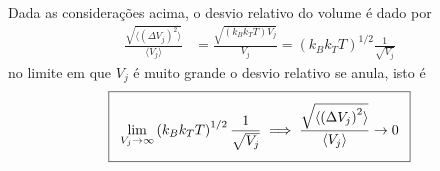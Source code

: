 \begin{prob}
\begin{sol}
\begin{enumerate}[label=\alph *)]
      Dada as considerações acima, o desvio relativo do volume é dado por
      \begin{align}
       \frac{\sqrt{\langle \left(\Delta V_j\right)^2\rangle}}{\langle V_j\rangle}&=\frac{\sqrt{\left(k_Bk_TT\right)V_j}}{V_j}=\left(k_Bk_TT\right)^{1/2}\frac{1}{\sqrt{V_j}}  
      \end{align}
      no limite em que $V_j$ é muito grande o desvio relativo se anula, isto é
      \begin{align}
        \addtolength{\fboxsep}{5pt}
        \boxed{
          \begin{gathered}
            \lim_{V_j\to\infty}\left(k_Bk_TT\right)^{1/2}\frac{1}{\sqrt{V_j}}\implies\frac{\sqrt{\langle \left(\Delta V_j\right)^2\rangle}}{\langle V_j\rangle}\to 0
          \end{gathered}
        }
      \end{align}
    \end{enumerate}
  \end{sol}
\end{prob}

